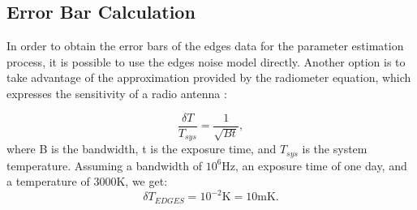 \documentclass[12pt, TexShade, letterpaper]{report}
\begin{document}
\subsection{Error Bar Calculation}
\label{chap:results,sub:edges,subsub:error}
In order to obtain the error bars of the \gls{edges} data for the parameter estimation process, it is possible to use the \gls{edges} noise model directly. Another option is to take advantage of the approximation provided by the radiometer equation, which expresses the sensitivity of a radio antenna \cite{sensitivity_1, sensitivity_2}:\par
\begin{equation}
    \frac{\delta T}{T_{sys}} = \frac{1}{\sqrt{Bt}},
\end{equation}
where B is the bandwidth, t is the exposure time, and $T_{sys}$ is the system temperature. Assuming a bandwidth of $10^6\mathrm{Hz}$, an exposure time of one day, and a temperature of $\mathrm{3000K}$, we get:
\begin{equation}
   \delta T_{EDGES} = \mathrm{10 ^{-2}K} = \mathrm{10mK}. 
\end{equation}
\end{document}
